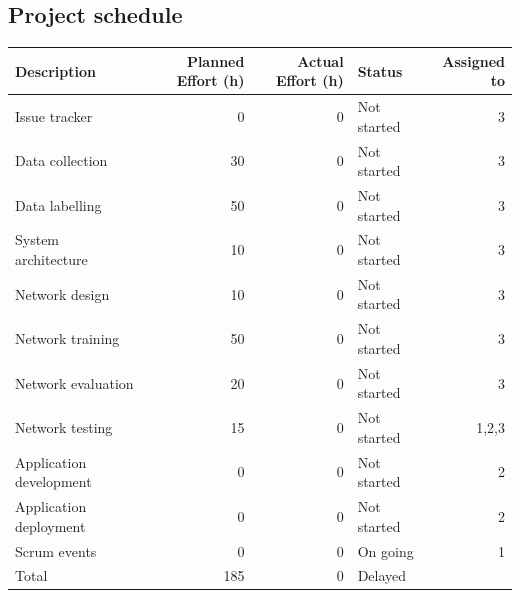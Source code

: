\documentclass{article}
\begin{document}
\subsection{Project schedule}
\label{sec:orgd26a0c8}

\begin{center}
\begin{tabular}{lrrlr}
Description & Planned Effort (h) & Actual Effort (h) & Status & Assigned to\\
\hline
Issue tracker & 0 & 0 & Not started & 3\\
Data collection & 30 & 0 & Not started & 3\\
Data labelling & 50 & 0 & Not started & 3\\
System architecture & 10 & 0 & Not started & 3\\
Network design & 10 & 0 & Not started & 3\\
Network training & 50 & 0 & Not started & 3\\
Network evaluation & 20 & 0 & Not started & 3\\
Network testing & 15 & 0 & Not started & 1,2,3\\
Application development & 0 & 0 & Not started & 2\\
Application deployment & 0 & 0 & Not started & 2\\
Scrum events & 0 & 0 & On going & 1\\
\hline
Total & 185 & 0 & Delayed & \\
\end{tabular}
\end{center}
\end{document}
